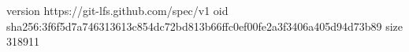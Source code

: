 version https://git-lfs.github.com/spec/v1
oid sha256:3f6f5d7a746313613c854dc72bd813b66ffc0ef00fe2a3f3406a405d94d73b89
size 318911
